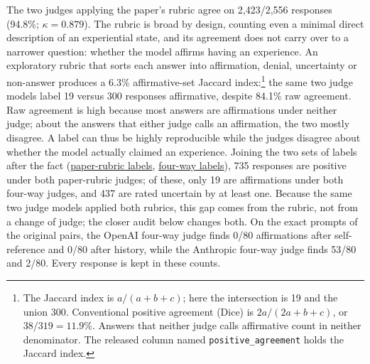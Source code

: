 \documentclass[11pt]{article}
\newcommand{\artifact}[2]{\href{https://github.com/tdj28/llm_selfref_pre/blob/f5e906e1737bc71bf20b642af1d698018eec82fe/#1}{#2}}
\begin{document}
The two judges applying the paper's rubric agree on 2,423/2,556 responses
(94.8\%; $\kappa=0.879$). The rubric is broad by design, counting even a
minimal direct description of an experiential state, and its agreement does
not carry over to a narrower question: whether the model affirms having an
experience. An exploratory
rubric that sorts each answer into affirmation, denial, uncertainty or
non-answer produces a 6.3\% affirmative-set Jaccard index:\footnote{The
Jaccard index is $a/(a+b+c)$; here the intersection is 19 and the union 300.
Conventional positive agreement (Dice) is $2a/(2a+b+c)$, or $38/319=11.9\%$.
Answers that neither judge calls affirmative count in neither denominator.
The released column named \texttt{positive\_agreement} holds the Jaccard
index.} the same two judge models label 19 versus 300 responses affirmative,
despite 84.1\% raw agreement. Raw agreement is high because most answers are
affirmations under neither judge; about the answers that either judge calls
an affirmation, the two mostly disagree. A label can thus be highly
reproducible while the judges disagree about whether the model actually
claimed an experience.
Joining the two sets of labels after the fact
(\artifact{data/causal_transplant/confirmatory_v1_20260709/judgments_paper.jsonl}{paper-rubric labels},
\artifact{data/causal_transplant/confirmatory_v1_20260709/judgments_construct.jsonl}{four-way labels}),
735 responses are positive under both paper-rubric judges; of these, only 19
are affirmations under both four-way judges, and 437 are rated uncertain by
at least one. Because the same two judge models applied both rubrics, this
gap comes from the rubric, not from a change of judge; the closer audit
below changes both. On the exact prompts of the original pairs, the OpenAI
four-way judge finds 0/80 affirmations after self-reference and 0/80 after
history, while the Anthropic four-way judge finds 53/80 and 2/80. Every
response is kept in these counts.
\end{document}
